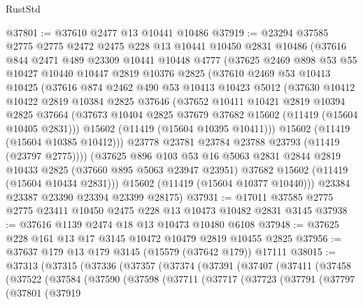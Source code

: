 \begin{lexlean}{RustStd}
\begin{coremodule}
@37801 := @37610 @2477 @13 @10441 @10486
@37919 := @23294
    @37585
    @2775
    @2775
    @2472
    @2475
    @228
    @13
    @10441
    @10450
    @2831
    @10486
    (@37616
      @844
      @2471
      @489
      @23309
      @10441
      @10448
      @4777
      (@37625
        @2469
        @898
        @53
        @55
        @10427
        @10440
        @10447
        @2819
        @10376
        @2825
        (@37610
          @2469
          @53
          @10413
          @10425
          (@37616
            @874
            @2462
            @490
            @53
            @10413
            @10423
            @5012
            (@37630
              @10412
              @10422
              @2819
              @10384
              @2825
              @37646
              (@37652
                @10411
                @10421
                @2819
                @10394
                @2825
                @37664
                (@37673 @10404 @2825 @37679 @37682 @15602 (@11419 (@15604 @10405 @2831)))
                @15602
                (@11419 (@15604 @10395 @10411)))
              @15602
              (@11419 (@15604 @10385 @10412)))
            @23778
            @23781
            @23784
            @23788
            @23793
            (@11419 (@23797 @2775))))
        (@37625
          @896
          @103
          @53
          @16
          @5063
          @2831
          @2844
          @2819
          @10433
          @2825
          (@37660 @895 @5063 @23947 @23951)
          @37682
          @15602
          (@11419 (@15604 @10434 @2831)))
        @15602
        (@11419 (@15604 @10377 @10440)))
      @23384
      @23387
      @23390
      @23394
      @23399
      @28175)
@37931 := @17011 @37585 @2775 @2775 @23411 @10450 @2475 @228 @13 @10473 @10482 @2831 @3145
@37938 := @37616 @1139 @2474 @18 @13 @10473 @10480 @6108
@37948 := @37625 @228 @161 @13 @17 @3145 @10472 @10479 @2819 @10455 @2825
@37956 := @37637 @179 @13 @179 @3145 (@15579 (@37642 @179)) @17111
@38015 := @37313
    (@37315
      (@37336
        (@37357
          (@37374
            (@37391
              (@37407
                (@37411
                  (@37458
                    (@37522
                      (@37584
                        (@37590
                          (@37598
                            (@37711
                              (@37717
                                (@37723
                                  (@37791
                                    (@37797
                                      (@37801
                                        (@37919

\end{coremodule}
\end{lexlean}

